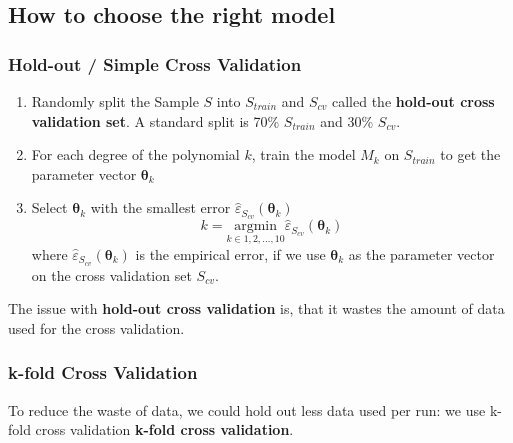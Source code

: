 \documentclass[11pt]{article}
\begin{document}
\subsection{How to choose the right model}

\subsubsection{Hold-out / Simple Cross Validation}
\begin{enumerate}
    \item Randomly split the Sample $S$ into $S_{train}$ and $S_{cv}$ called the \textbf{hold-out cross validation set}. A standard split is 70\% $S_{train}$ and 30\% $S_{cv}$.
    \item For each degree of the polynomial $k$, train the model $M_k$ on $S_{train}$ to get the parameter vector $\bm{\theta}_k$
    \item Select $\bm{\theta}_k$ with the smallest error $\hat{\varepsilon}_{S_{cv}}(\bm{\theta}_k)$
          \begin{equation*}
              k = \underset{k\in{1,2,...,10}}{\text{argmin}}\hat{\varepsilon}_{S_{cv}}(\bm{\theta}_k)
          \end{equation*}
          where $\hat{\varepsilon}_{S_{cv}}(\bm{\theta}_k)$ is the empirical error, if we use $\bm{\theta}_k$ as the parameter vector on the cross validation set $S_{cv}$.
\end{enumerate}

The issue with \textbf{hold-out cross validation} is, that it wastes the amount of data used for the cross validation.

\subsubsection{k-fold Cross Validation}

To reduce the waste of data, we could hold out less data used per run: we use k-fold cross validation \textbf{k-fold cross validation}.
\end{document}
